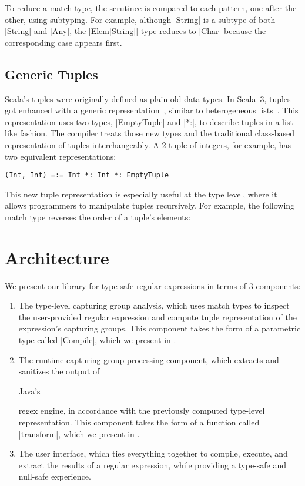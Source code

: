 \noindent
To reduce a match type, the scrutinee is compared to each pattern, one after the other, using subtyping.
For example, although |String| is a subtype of both |String| and |Any|, the |Elem[String]| type reduces to |Char| because the corresponding case appears first.

\subsection{Generic Tuples}
\label{subsec:generic-tuples}

Scala's tuples were originally defined as plain old data types.
In Scala~3, tuples got enhanced with a generic representation~\citep{bazzucchi2021tuples}, similar to heterogeneous lists~\citep{kiselyov2004strongly}.
This representation uses two types, |EmptyTuple| and |*:|, to describe tuples in a list-like fashion.
The compiler treats those new types and the traditional class-based representation of tuples interchangeably.
A 2-tuple of integers, for example, has two equivalent representations:

\begin{lstlisting}
(Int, Int) =:= Int *: Int *: EmptyTuple
\end{lstlisting}

\noindent
This new tuple representation is especially useful at the type level, where it allows programmers to manipulate tuples recursively.
For example, the following match type reverses the order of a tuple's elements:

\tupleReverseA
\vspace{-3pt}
\tupleReverseB

\section{Architecture}
\label{sec:architecture}

We present our library for type-safe regular expressions in terms of 3 components:

\begin{enumerate}
  \item The type-level capturing group analysis, which uses match types to inspect the user-provided regular expression and compute tuple representation of the expression's capturing groups.
  This component takes the form of a parametric type called |Compile|, which we present in .

  \item The runtime capturing group processing component, which extracts and sanitizes the output of \begin{diff}Java's\end{diff} regex engine, in accordance with the previously computed type-level representation.
  This component takes the form of a function called |transform|, which we present in .

  \item The user interface, which ties everything together to compile, execute, and extract the results of a regular expression, while providing a type-safe and null-safe experience.
\end{enumerate}

